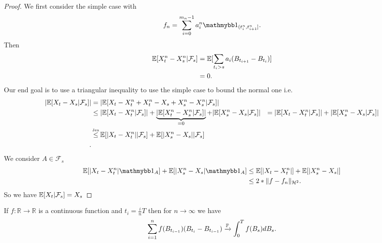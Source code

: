 \begin{proof}
 We first consider the simple case with 
 \begin{align*}
   f_n = \sum_{i=0}^{m_n - 1} a_i^{n}  \cha_{(t_i^{n},t_{i+1}^{n}  ]}
 .\end{align*}
 Then 
 \begin{align*}
   \E[X_{t}^{n} - X_{s}^{n} | \mathcal{F}_s  ] &= \E[\sum_{t_i > s} a_i(B_{t_{i+1}}-B_{t_i})]\\
                                               &=  0
 .\end{align*}
Our end goal is to use a triangular inequality to use the simple case to bound the normal one i.e.
\begin{align*}
  \abs{\E[X_t-X_s|\mathcal{F}_s]} &= \abs{\E[X_t-X_{t}^{n}+X_{t}^{n} -X_s +X_{s}^{n} -X_{s}^{n}  |\mathcal{F}_s]}\\
                                  &\le \abs{\E[X_t-X_{t}^{n}|\mathcal{F}_s]} + \underbrace{\abs{\E[X_{t}^{n} -X_{s}^{n}  |\mathcal{F}_s]}}_{=0} + \abs{\E[X_{s}^{n}-X_s|\mathcal{F}_s ]}
                                  &= \abs{\E[X_t-X_{t}^{n}|\mathcal{F}_s]} + \abs{\E[X_{s}^{n}-X_s|\mathcal{F}_s ]}\\
                                  &\myS{Jen}{\le } \E[\abs{X_t-X_{t}^{n}}|\mathcal{F}_s] + \E[\abs{X_{s}^{n}-X_s}|\mathcal{F}_s ]\\
.\end{align*}
We consider $A \in  \mathcal{F}_s$
\begin{align*}
  \E[\abs{X_t-X_{t}^{n}}\cha_A] + \E[\abs{X_{s}^{n}-X_s}\cha_A ] &\le \E[\abs{X_t-X_{t}^{n}}] + \E[\abs{X_{s}^{n}-X_s} ]\\
                                                                 &\le 2*\|f-f_n\|_{\mathcal{H}^2}
.\end{align*}
So we have $\E[X_t |\mathcal{F}_s] = X_s$
\end{proof}
\begin{Theorem}
 If $f : \mathbb{R} \to \mathbb{R} $  is a continuous function and  $t_i = \frac{i}{n}T$ then for $n\to \infty$ we have
 \begin{align*}
   \sum_{i=1}^{n} f(B_{t_{i-1}})(B_{t_i}-B_{t_{i-1}}) \xrightarrow{\P} \int_0^{T} f(B_s) dB_s
 .\end{align*}
\end{Theorem}
